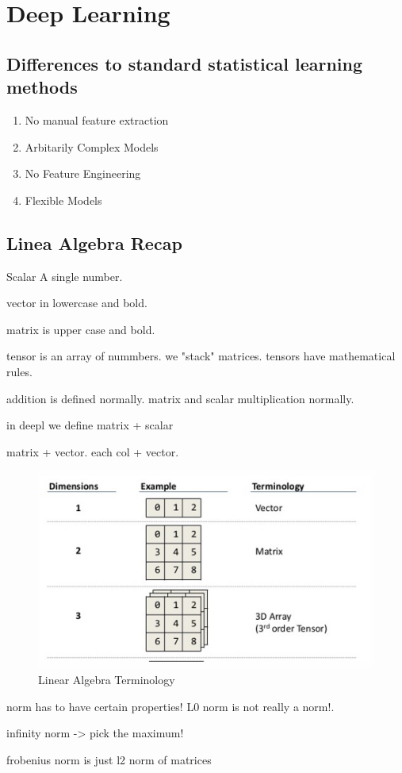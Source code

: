 \documentclass[../Main.tex]{subfiles}
\begin{document}
\chapter{Deep Learning}

\intro{

}

\section{Differences to standard statistical learning methods}
\begin{enumerate}
    \item No manual feature extraction
    \item Arbitarily Complex Models
    \item No Feature Engineering
    \item Flexible Models
\end{enumerate}

\section{Linea Algebra Recap}
Scalar
A single number.

vector in lowercase and bold.

matrix is upper case and bold.

tensor is an array of nummbers.
we "stack" matrices.
tensors have mathematical rules.

addition is defined normally.
matrix and scalar multiplication normally.


in deepl we define matrix + scalar

matrix + vector. each col + vector.


\begin{figure}[H]
    \centering
    \includegraphics[width=0.75\linewidth]{Images/terminology-linalg.png}
    \caption{Linear Algebra Terminology}
\end{figure}


norm has to have certain properties!
L0 norm is not really a norm!.

infinity norm -> pick the maximum!

frobenius norm is just l2 norm of matrices
\end{document}
